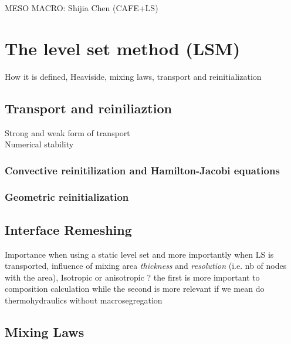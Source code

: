 MESO MACRO: Shijia Chen (CAFE+LS)

\section{The level set method (LSM)}
How it is defined, Heaviside, mixing laws, transport and reinitialization

\subsection{Transport and reiniliaztion}
Strong and weak form of transport \\
Numerical stability \\
\subsubsection{Convective reinitilization and Hamilton-Jacobi equations}
\subsubsection{Geometric reinitialization}

\subsection{Interface Remeshing}
Importance when using a static level set and more importantly when LS is transported,
influence of mixing area \emph{thickness} and \emph{resolution} (i.e. nb of nodes with the area),
Isotropic or anisotropic ? the first is more important to composition calculation while the second
is more relevant if we mean do thermohydraulics without macrosegregation

\subsection{Mixing Laws}